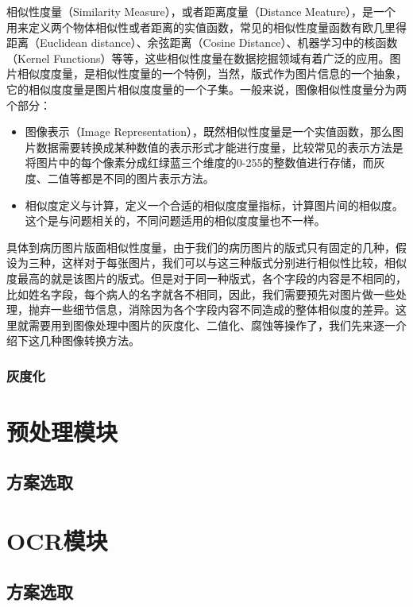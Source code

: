 相似性度量（Similarity Measure）\citep{lin1998information}，或者距离度量（Distance Meature），是一个用来定义两个物体相似性或者距离的实值函数\citep{singhal2001modern}，常见的相似性度量函数有欧几里得距离（Euclidean distance）\citep{wiki:Euclidean-distance}、余弦距离（Cosine Distance）\citep{wiki:Cosine-distance}、机器学习中的核函数（Kernel Functions）\citep{hofmann2008kernel}等等，这些相似性度量在数据挖掘领域有着广泛的应用\citep{tan2006introduction}。图片相似度度量，是相似性度量的一个特例，当然，版式作为图片信息的一个抽象，它的相似度度量是图片相似度度量的一个子集。一般来说，图像相似性度量分为两个部分\citep{goldberger2003efficient}：
\begin{itemize}
  \item 图像表示（Image Representation），既然相似性度量是一个实值函数，那么图片数据需要转换成某种数值的表示形式才能进行度量，比较常见的表示方法是将图片中的每个像素分成红绿蓝三个维度的0-255的整数值进行存储，而灰度、二值等都是不同的图片表示方法。
  \item 相似度定义与计算，定义一个合适的相似度度量指标，计算图片间的相似度。这个是与问题相关的，不同问题适用的相似度度量也不一样。
\end{itemize}
具体到病历图片版面相似性度量，由于我们的病历图片的版式只有固定的几种，假设为三种，这样对于每张图片，我们可以与这三种版式分别进行相似性比较，相似度最高的就是该图片的版式。但是对于同一种版式，各个字段的内容是不相同的，比如姓名字段，每个病人的名字就各不相同，因此，我们需要预先对图片做一些处理，抛弃一些细节信息，消除因为各个字段内容不同造成的整体相似度的差异。这里就需要用到图像处理中图片的灰度化、二值化、腐蚀等操作了，我们先来逐一介绍下这几种图像转换方法。

\subsubsection*{灰度化}
\label{sub:灰度化}


\section{预处理模块}     %
\subsection{方案选取}


\section{OCR模块}     %
\subsection{方案选取}

